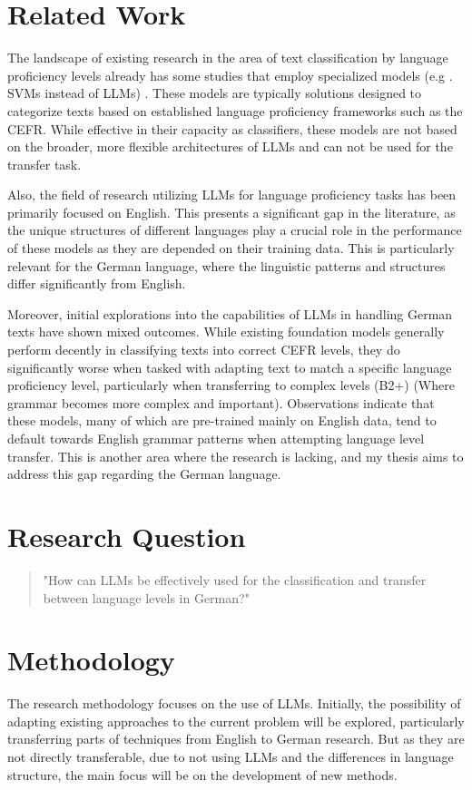 \documentclass{article}
\begin{document}
\section{Related Work}
The landscape of existing research in the area of text classification by language proficiency levels 
already has some studies that employ specialized models (e.g . SVMs instead of LLMs) \cite{automated_assessment} 
\cite{german_simplification} \cite{proficiency_classification}. These models are typically
solutions designed to categorize texts based on established language proficiency frameworks such as
the CEFR. While effective in their capacity as classifiers, these models are not based on the broader,
more flexible architectures of LLMs and can not be used for the transfer task.

Also, the field of research utilizing LLMs for language proficiency tasks has been primarily
focused on English. This presents a significant gap in the literature, as the unique structures
of different languages play a crucial role in the performance of these models as they are depended on
their training data. This is particularly relevant for the German language, where the linguistic
patterns and structures differ significantly from English.

Moreover, initial explorations into the capabilities of LLMs in handling German texts have shown
mixed outcomes. While existing foundation models generally perform decently in classifying texts
into correct CEFR levels, they do significantly worse when tasked with adapting text to match a
specific language proficiency level, particularly when transferring to complex levels (B2+) (Where
grammar becomes more complex and important). Observations indicate that these models, many of which
are pre-trained mainly on English data, tend to default towards English grammar patterns when
attempting language level transfer. This is another area where the research is lacking, and my
thesis aims to address this gap regarding the German language.

\section{Research Question}
\begin{quote}
"How can LLMs be effectively used for the classification and transfer between language levels in German?"
\end{quote}

\section{Methodology}
The research methodology focuses on the use of LLMs. Initially, the possibility of adapting existing 
approaches to the current problem will be explored, particularly transferring parts of techniques 
from English to German research. But as they are not directly transferable, due to not using LLMs
and the differences in language structure, the main focus will be on the development of new methods.
\end{document}
